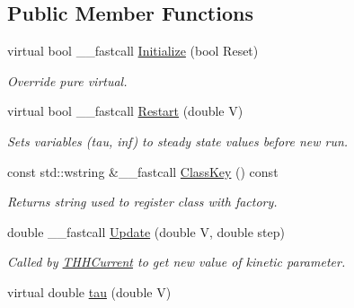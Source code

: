 \subsection*{Public Member Functions}
\begin{DoxyCompactItemize}
\item 
\hypertarget{class_t_h_h_kinetics_factor_a781fb1bd7d2f85e9193f2f6c4d81d058}{virtual bool \+\_\+\+\_\+fastcall \hyperlink{class_t_h_h_kinetics_factor_a781fb1bd7d2f85e9193f2f6c4d81d058}{Initialize} (bool Reset)}\label{class_t_h_h_kinetics_factor_a781fb1bd7d2f85e9193f2f6c4d81d058}

\begin{DoxyCompactList}\small\item\em Override pure virtual. \end{DoxyCompactList}\item 
\hypertarget{class_t_h_h_kinetics_factor_a587e585d53381e0194c5f98e1f0cb0f6}{virtual bool \+\_\+\+\_\+fastcall \hyperlink{class_t_h_h_kinetics_factor_a587e585d53381e0194c5f98e1f0cb0f6}{Restart} (double V)}\label{class_t_h_h_kinetics_factor_a587e585d53381e0194c5f98e1f0cb0f6}

\begin{DoxyCompactList}\small\item\em Sets variables (tau, inf) to steady state values before new run. \end{DoxyCompactList}\item 
const std\+::wstring \&\+\_\+\+\_\+fastcall \hyperlink{class_t_h_h_kinetics_factor_ac161d432e14597146b0bd45cbed7e225}{Class\+Key} () const 
\begin{DoxyCompactList}\small\item\em Returns string used to register class with factory. \end{DoxyCompactList}\item 
double \+\_\+\+\_\+fastcall \hyperlink{class_t_h_h_kinetics_factor_aa673d6cce19ae2a1e834fa1a99ef4130}{Update} (double V, double step)
\begin{DoxyCompactList}\small\item\em Called by \hyperlink{class_t_h_h_current}{T\+H\+H\+Current} to get new value of kinetic parameter. \end{DoxyCompactList}\item 
\hypertarget{class_t_h_h_kinetics_factor_a52ed711cf78c030d5e8fe7b19fb5a1dc}{virtual double \hyperlink{class_t_h_h_kinetics_factor_a52ed711cf78c030d5e8fe7b19fb5a1dc}{tau} (double V)}\label{class_t_h_h_kinetics_factor_a52ed711cf78c030d5e8fe7b19fb5a1dc}


\end{DoxyCompactItemize}
